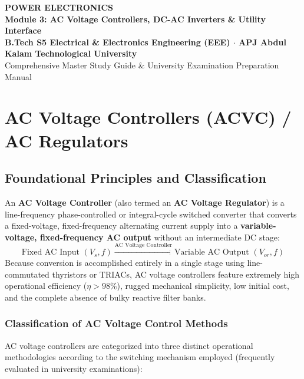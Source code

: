 \documentclass[11pt,a4paper]{article}
\begin{document}
\begin{center}
  {\LARGE\bfseries\color{navyprimary}POWER ELECTRONICS}\\[2mm]
  {\Large\bfseries\color{accentblue}Module 3: AC Voltage Controllers, DC-AC Inverters \& Utility Interface}\\[3mm]
  {\normalsize\bfseries B.Tech S5 Electrical \& Electronics Engineering (EEE) $\cdot$ APJ Abdul Kalam Technological University}\\[1mm]
  {\small\color{gray}Comprehensive Master Study Guide \& University Examination Preparation Manual}\\[2mm]
  \noindent\makebox[\linewidth]{\color{navyprimary}\rule{\linewidth}{1.5pt}}
\end{center}

\vspace{-2mm}
\tableofcontents
\vspace{4mm}
\noindent\makebox[\linewidth]{\color{cardborder}\rule{\linewidth}{0.6pt}}
\vspace{2mm}

\section{AC Voltage Controllers (ACVC) / AC Regulators}

\subsection{Foundational Principles and Classification}

An \textbf{AC Voltage Controller} (also termed an \textbf{AC Voltage Regulator}) is a line-frequency phase-controlled or integral-cycle switched converter that converts a fixed-voltage, fixed-frequency alternating current supply into a \textbf{variable-voltage, fixed-frequency AC output} without an intermediate DC stage:
\begin{equation}
\text{Fixed AC Input } (V_s, f) \xrightarrow{\text{AC Voltage Controller}} \text{Variable AC Output } (V_{or}, f)
\end{equation}
Because conversion is accomplished entirely in a single stage using line-commutated thyristors or TRIACs, AC voltage controllers feature extremely high operational efficiency ($\eta > 98\%$), rugged mechanical simplicity, low initial cost, and the complete absence of bulky reactive filter banks.

\subsubsection{Classification of AC Voltage Control Methods}
AC voltage controllers are categorized into three distinct operational methodologies according to the switching mechanism employed (frequently evaluated in university examinations):
\end{document}
